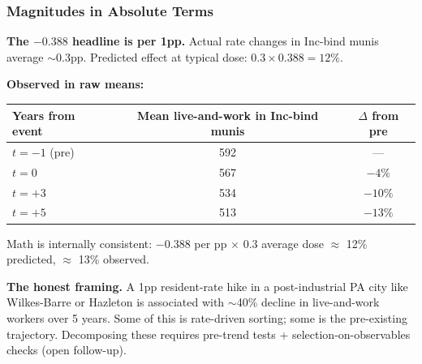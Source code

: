 \documentclass[xcolor = x11names, compress, aspectratio = 169]{beamer}
\begin{document}
    \begin{frame}
    \frametitle{Magnitudes in Absolute Terms}
        \footnotesize
        \textbf{The $-0.388$ headline is per 1pp.} Actual rate changes in
        Inc-bind munis average $\sim$0.3pp. Predicted effect at typical dose:
        $0.3 \times 0.388 = 12\%$.
        \medskip

        \textbf{Observed in raw means:}
        \scriptsize
        \renewcommand{\arraystretch}{1.10}
        \setlength{\tabcolsep}{8pt}
        \begin{tabular}{lcc}
            \toprule
            Years from event & Mean live-and-work in Inc-bind munis & $\Delta$ from pre \\
            \midrule
            $t = -1$ (pre)        & 592 & --- \\
            $t = 0$               & 567 & $-4\%$ \\
            $t = +3$              & 534 & $-10\%$ \\
            $t = +5$              & 513 & \textbf{$-13\%$} \\
            \bottomrule
        \end{tabular}
        \medskip

        \footnotesize
        Math is internally consistent: $-0.388$ per pp $\times$ 0.3 average dose
        $\approx$ 12\% predicted, $\approx$ 13\% observed.
        \medskip

        \textbf{The honest framing.} A 1pp resident-rate hike in a post-industrial
        PA city like Wilkes-Barre or Hazleton is associated with $\sim$40\%
        decline in live-and-work workers over 5 years. Some of this is
        rate-driven sorting; some is the pre-existing trajectory. Decomposing
        these requires pre-trend tests + selection-on-observables checks
        (open follow-up).
    \end{frame}
\end{document}
